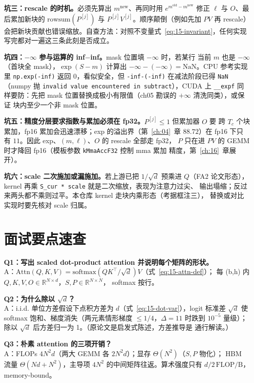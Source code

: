 \textbf{坑三：rescale 的时机。}必须先算出 $m^{\mathrm{new}}$、再同时用
$e^{m^{\mathrm{old}} - m^{\mathrm{new}}}$ 修正 $\ell$ 与 $O$、最后累加新块的
$\mathrm{rowsum}(P^{[j]})$ 与 $P^{[j]}V^{[j]}$。顺序颠倒（例如先加 $PV$ 再 rescale）
会把新块贡献也错误缩放。自查方法：对照不变量式~\ref{eq:15-invariant}，任何实现
写完都对一遍这三条此刻是否成立。

\textbf{坑四：$-\infty$ 参与运算的 inf$-$inf。}\allowbreak{}mask 位置填 $-\infty$ 时，若某行
当前 $m$ 也是 $-\infty$（首块全 mask），$\exp(S - m)$ 计算出 $-\infty - (-\infty) =
\mathrm{NaN}$。CPU 参考实现里 \texttt{np.exp(-inf)} 返回 0，看似安全，但
\texttt{-inf-(-inf)} 在减法阶段已得 \texttt{NaN}（numpy 抛
\texttt{invalid value encountered in subtract}），CUDA 上 \texttt{\_\_expf}
同样要防：先把 mask 位置替换成极小有限值（ch05 勘误的 $+\infty$ 清洗同类），或保证
块内至少一个非 mask 位置。

\textbf{坑五：精度分层要求指数与累加必须在 fp32。}$P^{[j]} \le 1$ 但累加器 $O$ 要
跨 $T_c$ 个块累加，fp16 累加会迅速漂移；exp 的溢出界（第~\ref{ch:04}~章
$88.72$）在 fp16 下只有 $11$。因此 exp、$(m, \ell)$、$O$ 的 rescale 全部走 fp32，
$P$ 只在进 $PV$ 的 GEMM 时才降回 fp16（模板参数 \texttt{kMmaAccF32} 控制 mma 累加
精度，第~\ref{ch:16}~章展开）。

\textbf{坑六：scale 二次施加或漏施加。}若上游已把 $1/\sqrt{d}$ 预乘进 $Q$（FA2
论文形态），kernel 再乘 \texttt{S\_cur * scale} 就是二次缩放，表现为注意力过尖、
输出塌缩；反过来两头都不乘则过平。本仓库 kernel 走块内乘形态（考据框注三），
替换或对比实现时要先核对 scale 归属。

\section{面试要点速查}

\textbf{Q1：写出 scaled dot-product attention 并说明每个矩阵的形状。}\\
A：$\mathrm{Attn}(Q,K,V) = \mathrm{softmax}(QK^{\top}/\sqrt{d})V$（式~\ref{eq:15-attn-def}）；
每 (b,h) 内 $Q, K, V, O \in \mathbb{R}^{N \times d}$，$S, P \in \mathbb{R}^{N \times N}$，
softmax 按行。

\textbf{Q2：为什么除以 $\sqrt d$？}\\
A：i.i.d. 单位方差假设下点积方差为 $d$（式~\ref{eq:15-dot-var}），logit 标准差
$\sqrt d$ 使 softmax 饱和、梯度消失（两元素情形梯度 $\le 1/4$，$\Delta{=}11$ 时跌到
$10^{-5}$ 量级）；除以 $\sqrt d$ 后方差归一为 1。（原论文是启发式陈述，方差推导是
通行解读。）

\textbf{Q3：朴素 attention 的三项开销？}\\
A：FLOPs $4N^{2}d$（两大 GEMM 各 $2N^{2}d$）；显存 $\Theta(N^{2})$（$S, P$ 物化）；
HBM 流量 $\Theta(Nd + N^{2})$，主导项 $4N^{2}$ 的中间矩阵往返。算术强度只有
$d/2\,\mathrm{FLOP/B}$，memory-bound。


